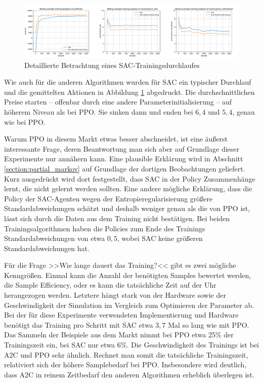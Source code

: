 \begin{figure}[htb]
	\centering
	\includegraphics[width=\textwidth]{main/sac_detailed_analysis.pdf}
	\caption{Detaillierte Betrachtung eines SAC-Trainingsdurchlaufes}
	\label{graphic:SACDetails}
\end{figure}

Wie auch für die anderen Algorithmen wurden für SAC ein typischer Durchlauf und die gemittelten Aktionen in Abbildung \ref{graphic:SACDetails} abgedruckt.
Die durchschnittlichen Preise starten -- offenbar durch eine andere Parameterinitialisierung -- auf höherem Niveau als bei PPO.
Sie sinken dann und enden bei $6{,}4$ und $5{,}4$, genau wie bei PPO.

Warum PPO in diesem Markt etwas besser abschneidet, ist eine äußerst interessante Frage, deren Beantwortung man sich aber auf Grundlage dieser Experimente nur annähern kann.
Eine plausible Erklärung wird in Abschnitt \ref{section:partial_markov} auf Grundlage der dortigen Beobachtungen geliefert.
Kurz ausgedrückt wird dort festgestellt, dass SAC in der Policy Zusammenhänge lernt, die nicht gelernt werden sollten.
Eine andere mögliche Erklärung, dass die Policy der SAC-Agenten wegen der Entropieregularisierung größere Standardabweichungen schätzt und deshalb weniger genau als die von PPO ist, lässt sich durch die Daten aus dem Training nicht bestätigen.
Bei beiden Trainingsalgorithmen haben die Policies zum Ende des Trainings Standardabweichungen von etwa $0{,}5$, wobei SAC keine größeren Standardabweichungen hat.

Für die Frage >>Wie lange dauert das Training?<< gibt es zwei mögliche Kenngrößen.
Einmal kann die Anzahl der benötigten Samples bewertet werden, die Sample Efficiency, oder es kann die tatsächliche Zeit auf der Uhr herangezogen werden.
Letztere hängt stark von der Hardware sowie der Geschwindigkeit der Simulation im Vergleich zum Optimieren der Parameter ab.
Bei der für diese Experimente verwendeten Implementierung und Hardware benötigt das Training pro Schritt mit SAC etwa $3{,}7$ Mal so lang wie mit PPO.
Das Sammeln der Beispiele aus dem Markt nimmt bei PPO etwa 25\% der Trainingszeit ein, bei SAC nur etwa 6\%.
Die Geschwindigkeit des Trainings ist bei A2C und PPO sehr ähnlich.
Rechnet man somit die tatsächliche Trainingszeit, relativiert sich der höhere Samplebedarf bei PPO.
Insbesondere wird deutlich, dass A2C in reinem Zeitbedarf den anderen Algorithmen erheblich überlegen ist.

